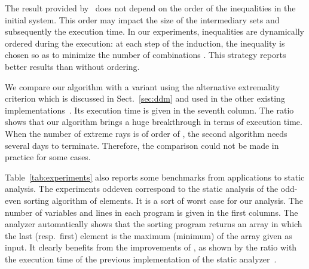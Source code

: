 \documentclass[proceedings]{stacs}
\newcommand{\ComputeExtremal}{\Call{ComputeExtreme}{}}
\begin{document}
The result provided by~\ComputeExtremal{} does not depend on the order of the inequalities in the initial system. This order may impact the size of the intermediary sets and subsequently the execution time. In our experiments, inequalities are dynamically ordered during the execution: at each step of the induction, the inequality  is chosen so as to minimize the number of combinations . 
This strategy reports better results than without ordering.


We compare our algorithm with a variant using the alternative extremality criterion which is discussed in Sect.~\ref{sec:ddm} and used in the other existing implementations~\cite{toolbox,AGG08}. Its execution time  is given in the seventh column. The ratio  shows that our algorithm brings a huge breakthrough in terms of execution time. When the number of extreme rays is of order of , the second algorithm needs several days to terminate. Therefore, the comparison could not be made in practice for some cases.

Table~\ref{tab:experiments} also reports some benchmarks from applications to static analysis. The experiments oddeven correspond to the static analysis of the odd-even sorting algorithm of  elements. It is a sort of worst case for our analysis. The number of variables and lines in each program is given in the first columns. The analyzer automatically shows that the sorting program returns an array in which the last (resp.\ first) element is the maximum (minimum) of the array given as input. It clearly benefits from the improvements of , as shown by the ratio with the execution time  of the previous implementation of the static analyzer~\cite{AGG08}.


\end{document}
